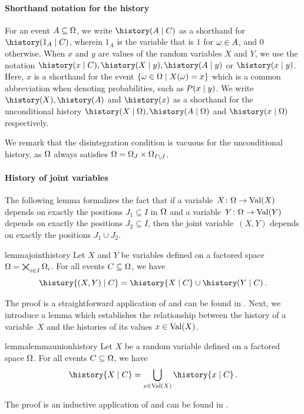 \documentclass[USenglish,onecolumn]{article}
\begin{document}
\paragraph{Shorthand notation for the history}
For an event $A\subseteq \Omega$, we write $\history(A
\given C)$ as a shorthand for $\history(1_A\given C)$, wherein $1_A$ is the variable that is $1$ for $\omega \in A$, and $0$ otherwise.
When $x$ and $y$ are values of the random variables $X$ and $Y$, we use the notation $\history(x\given C), \history(X\given y), \history(A\given y)$ or $\history(x\given y)$. Here, $x$ is a shorthand for the event $\{\omega \in \Omega\mid X(\omega)=x\}$ which is a common abbreviation when denoting probabilities, such as $P(x\mid y)$.
We write $\history(X), \history(A)$ and $\history(x)$ as a shorthand for the unconditional history $\history(X\mid \Omg), \history(A\given \Omg)$ and $\history(x\given\Omg)$ respectively.

We remark that the disintegration condition is vacuous for the unconditional history, as $\Omega$ always satisfies $\Omega=\Omega_J\times \Omega_{I\backslash J}$.

\paragraph{History of joint variables}
The following lemma formalizes the fact that if a variable~$X\colon\Omega\to\textnormal{Val}(X)$ depends on exactly the positions $J_1\subseteq I$ in $\Omega$ and a variable~$Y\colon\Omega\to\textnormal{Val}(Y)$ depends on exactly the positions $J_2\subseteq I$, then the joint variable~$(X,Y)$ depends on exactly the positions $J_1\cup J_2$.
\begin{restatable}{lemma}{jointhistory}\label{lemma:jointhistory}
Let $X$ and $Y$ be  variables defined on a factored space $\Omega=\bigtimes_{i\in I}\Omega_i$. For all events $C\subseteq \Omega$, we have
\[\history{(X,Y) \given C}=\history{X \given C}\cup \history(Y \given C)\,.\]
\end{restatable}
The proof is a straightforward application of 
and can be found in .
%
Next, we introduce a lemma which establishes the relationship between the history of a variable~$X$ and the histories of its values $x\in \textnormal{Val}(X)$.
\begin{restatable}{lemma}{lemmaunionhistory}%
\label{lemma:unionhistory}%
Let $X$ be a random variable defined on a factored space $\Omega$. For all events $C\subseteq \Omega$, we have
\[\history{X \given C}=\bigcup_{x\in\Val(X)}\history{x \given C}\,.\]
\end{restatable}
\noindent
The proof is an inductive application of  and can be found in .
\end{document}
